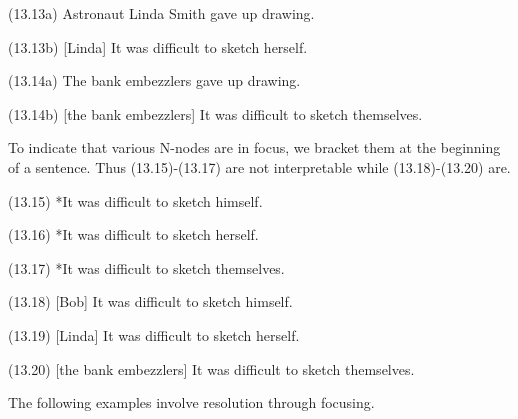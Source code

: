\documentclass{article}
\begin{document}
\begin{enumerate*}
\item[(13.13a)] Astronaut Linda Smith gave up drawing.
\item[(13.13b)] [Linda] It was difficult to sketch herself.
\end{enumerate*}

\begin{enumerate*}
\item[(13.14a)] The bank embezzlers gave up drawing.
\item[(13.14b)] [the bank embezzlers] It was difficult to sketch themselves.
\end{enumerate*}

To indicate that various N-nodes are in focus, we bracket them
at the beginning of a sentence. Thus (13.15)-(13.17) are not
interpretable while (13.18)-(13.20) are.

\begin{enumerate*}
\item[(13.15)] *It was difficult to sketch himself.
\end{enumerate*}
\begin{enumerate*}
\item[(13.16)] *It was difficult to sketch herself.
\end{enumerate*}
\begin{enumerate*}
\item[(13.17)] *It was difficult to sketch themselves.
\end{enumerate*}
\begin{enumerate*}
\item[(13.18)] [Bob] It was difficult to sketch
himself.
\end{enumerate*}
\begin{enumerate*}
\item[(13.19)] [Linda] It was difficult
to sketch herself.
\end{enumerate*}
\begin{enumerate*}
\item[(13.20)] [the bank embezzlers] It was difficult to
sketch themselves.
\end{enumerate*}

The following examples involve resolution through focusing.

\end{document}
